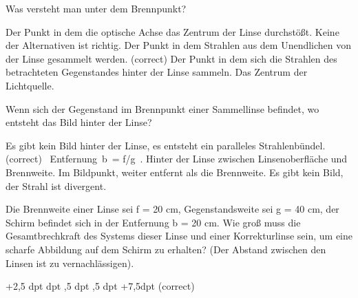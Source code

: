 \documentclass[11pt]{exam}
\begin{document}
\setlength{\voffset}{-0.5in}
\setlength{\headsep}{5pt}

\hspace{2mm}
 \hspace{5mm}
\vspace{4mm}

\begin{questions}

\question Was versteht man unter dem Brennpunkt?

\begin{choices}
	\choice Der Punkt in dem die optische Achse das Zentrum der Linse durchstößt.
	\choice Keine der Alternativen ist richtig.
	\choice Der Punkt in dem Strahlen aus dem Unendlichen von der Linse gesammelt werden. (correct)
	\choice Der Punkt in dem sich die Strahlen des betrachteten Gegenstandes hinter der Linse sammeln.
	\choice Das Zentrum der Lichtquelle.
\end{choices}

\vspace{3mm}\question Wenn sich der Gegenstand im Brennpunkt einer Sammellinse befindet, wo entsteht das Bild hinter der Linse?

\begin{choices}
	\choice Es gibt kein Bild hinter der Linse, es entsteht ein paralleles Strahlenbündel. (correct)
	\choice  Entfernung b = f/g .
	\choice Hinter der Linse zwischen Linsenoberfläche und Brennweite.
	\choice Im Bildpunkt, weiter entfernt als die Brennweite.
	\choice Es gibt kein Bild, der Strahl ist divergent.
\end{choices}

\vspace{3mm}\question Die Brennweite einer Linse sei f = 20 cm, Gegenstandsweite sei g = 40 cm, der Schirm befindet sich in der Entfernung b = 20 cm. Wie groß muss die Gesamtbrechkraft des Systems dieser Linse und einer Korrekturlinse sein, um eine scharfe Abbildung auf dem Schirm zu erhalten? (Der Abstand zwischen den Linsen ist zu vernachlässigen).

\begin{choices}
	\choice +2,5 dpt
	 dpt
	,5 dpt
	,5 dpt
	\choice +7,5dpt (correct)
\end{choices}


\end{questions}
\end{document}
